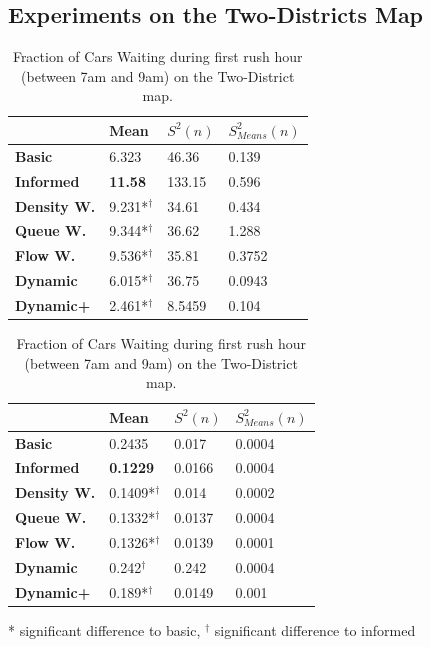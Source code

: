 \documentclass[11pt]{article}
\begin{document}
\subsection{Experiments on the Two-Districts Map}
\begin{table}[t]
\centering
\caption{Average Velocity of Cars during first rush hour (between 7am and 9am) on the Two-Districts map.}
\label{tab:velo-morning-twodi}
\begin{tabular}{l|l|l|l|}
\textbf{}                 & \textbf{Mean} & \textbf{$S^2(n)$} & \textbf{$S_{Means}^2(n)$} \\
\hline\textbf{Basic}      & 6.323          & 46.36             & 0.139                      \\
\textbf{Informed}   & \textbf{11.58}          & 133.15            & 0.596                      \\
\hline\textbf{Density W.} & 9.231*$^\dagger$          & 34.61             & 0.434                      \\
\textbf{Queue W.}   & 9.344*$^\dagger$ & 36.62             & 1.288                      \\
\textbf{Flow W.}    & 9.536*$^\dagger$          & 35.81             & 0.3752                     \\
\textbf{Dynamic}    & 6.015*$^\dagger$          & 36.75             & 0.0943                     \\
\textbf{Dynamic+}   & 2.461*$^\dagger$          & 8.5459            & 0.104                     
\end{tabular}
\vspace{20pt}
\centering
\caption{Fraction of Cars Waiting during first rush hour (between 7am and 9am) on the Two-District map.}
\label{tab:waiting-morning-twodi}
\begin{tabular}{l|l|l|l|}
\textbf{}                 & \textbf{Mean} & \textbf{$S^2(n)$} & \textbf{$S_{Means}^2(n)$} \\
\hline\textbf{Basic}      & 0.2435          & 0.017             & 0.0004                     \\
\textbf{Informed}   & \textbf{0.1229} & 0.0166            & 0.0004                     \\
\hline\textbf{Density W.} & 0.1409*$^\dagger$          & 0.014             & 0.0002                     \\
\textbf{Queue W.}   & 0.1332*$^\dagger$          & 0.0137            & 0.0004                     \\
\textbf{Flow W.}    & 0.1326*$^\dagger$      & 0.0139            & 0.0001                     \\
\textbf{Dynamic}    & 0.242$^\dagger$          & 0.242             & 0.0004                     \\
\textbf{Dynamic+}   & 0.189*$^\dagger$          & 0.0149             & 0.001                    
\end{tabular}

\small{* significant difference to basic, $^\dagger$ significant difference to informed}
\end{table}
\end{document}
